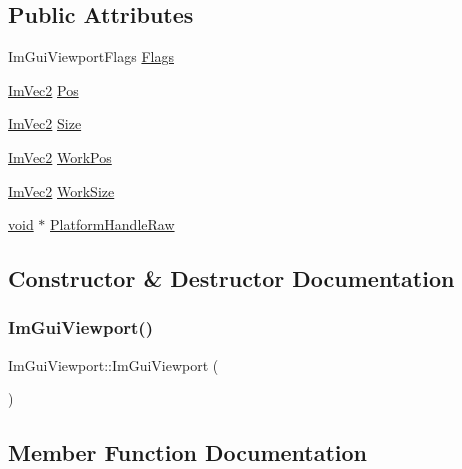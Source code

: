 \subsection*{Public Attributes}
\begin{DoxyCompactItemize}
\item 
Im\+Gui\+Viewport\+Flags \hyperlink{structImGuiViewport_a126b1ea962a2f400031aa67a20208350}{Flags}
\item 
\hyperlink{structImVec2}{Im\+Vec2} \hyperlink{structImGuiViewport_a271ff4e595757a809f237616dd07d525}{Pos}
\item 
\hyperlink{structImVec2}{Im\+Vec2} \hyperlink{structImGuiViewport_ab44a78f37dd56cc7581f715485485787}{Size}
\item 
\hyperlink{structImVec2}{Im\+Vec2} \hyperlink{structImGuiViewport_a9171354583726d867938e93023334d6b}{Work\+Pos}
\item 
\hyperlink{structImVec2}{Im\+Vec2} \hyperlink{structImGuiViewport_ac4c1ce7d912b72b42a14f00c8cefd8d0}{Work\+Size}
\item 
\hyperlink{imgui__impl__opengl3__loader_8h_ac668e7cffd9e2e9cfee428b9b2f34fa7}{void} $\ast$ \hyperlink{structImGuiViewport_ab0c79a0acf985c75f5cadd56ebab8eb5}{Platform\+Handle\+Raw}
\end{DoxyCompactItemize}


\subsection{Constructor \& Destructor Documentation}
\mbox{\label{structImGuiViewport_aa195d9a5b7ba8905c5064195a059868c}} 
\subsubsection{\texorpdfstring{Im\+Gui\+Viewport()}{ImGuiViewport()}}
{\footnotesize\ttfamily Im\+Gui\+Viewport\+::\+Im\+Gui\+Viewport (\begin{DoxyParamCaption}{ }\end{DoxyParamCaption})\hspace{0.3cm}{\ttfamily [inline]}}



\subsection{Member Function Documentation}
\mbox{\label{structImGuiViewport_aecb8b050853aae709f64b82319699bf8}} 
